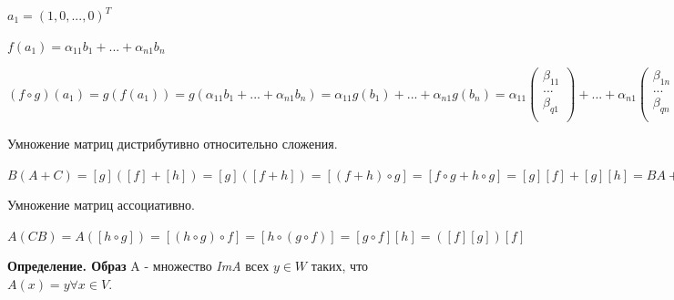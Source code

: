 \documentclass[a4paper]{article}
\begin{document}
\begin{hproof}
$a_1 = (1,0,...,0)^T$

$f(a_1) = \alpha_{11}b_1 + ... + \alpha_{n1}b_n$

$\displaystyle (f \circ g)(a_1) = g(f(a_1)) = g(\alpha_{11}b_1 + ... + \alpha_{n1}b_n) = \alpha_{11}g(b_1) + ... + \alpha_{n1}g(b_n) = 
\alpha_11 \begin{pmatrix}
	\beta_{11} \\
	... \\
 	\beta_{q1}\\
\end{pmatrix} + ... + \alpha_{n1} \begin{pmatrix}
	\beta_{1n} \\
	... \\
 	\beta_{qn}\\
\end{pmatrix} = [g] \begin{pmatrix}
	\alpha_{11} \\
	... \\
 	\alpha_{n1}\\
\end{pmatrix} = [g(f(a))] = [g][f](a)$



\end{hproof}

\begin{htheorem}
Умножение матриц дистрибутивно относительно сложения.
\end{htheorem}

\begin{hproof}
$B(A+C) = [g]([f]+[h]) = [g]([f+h]) = [(f+h) \circ g] = [f \circ g + h \circ g] = [g][f] + [g][h] = BA+BC$
\end{hproof}


\begin{htheorem}
Умножение матриц ассоциативно.
\end{htheorem}

\begin{hproof}
$A(CB) = A([h \circ g]) = [(h \circ g) \circ f] = [h \circ (g \circ f)] = [g \circ f][h] = ([f][g])[f]$
\end{hproof}

\newpage \begin{center}\begin{Large}\end{Large}\end{center}

\textbf{Определение. Образ} A - множество \textit{ImA} всех $y \in W$ таких, что $A(x) = y \forall x \in V$.
\end{document}
